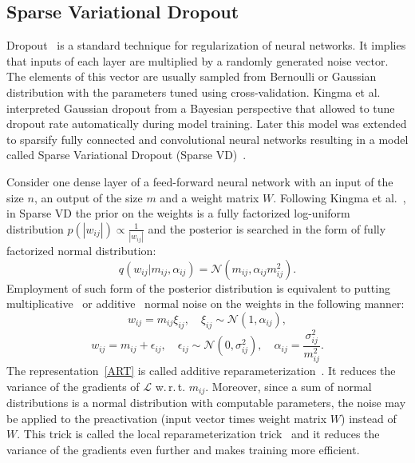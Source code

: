\documentclass{article}
\begin{document}
\subsection{Sparse Variational Dropout}
Dropout~\cite{dropout} is a standard technique for regularization of neural networks. It implies that inputs of each layer are multiplied by a randomly generated noise vector. 
The elements of this vector are usually sampled from Bernoulli or Gaussian distribution with the parameters tuned using cross-validation. Kingma et al.~ interpreted Gaussian dropout from a Bayesian perspective that allowed to tune dropout rate automatically during model training. Later this model was extended to sparsify fully connected and convolutional neural networks resulting in a model called Sparse Variational Dropout (Sparse VD)~\cite{dmolch}.

Consider one dense layer of a feed-forward neural network with an
input of the size $n$, an output of the size $m$ and 
a weight matrix $W$. 
Following Kingma et al.~, in Sparse VD the prior on the weights is a fully factorized log-uniform distribution $p(|w_{ij}|) \propto \frac 1 {|w_{ij}|}$ and the posterior is searched in the form of fully factorized normal distribution: 
\begin{equation}
q(w_{ij}|m_{ij}, \alpha_{ij}) = \mathcal{N}(m_{ij}, \alpha_{ij} m^2_{ij}).
\end{equation}
Employment of such form of the posterior distribution is equivalent to putting multiplicative~\cite{kingma} or additive~\cite{dmolch} normal noise on the weights in the following manner:
\begin{equation}
w_{ij} = m_{ij} \xi_{ij}, \quad \xi_{ij}\sim\mathcal{N}(1, \alpha_{ij}),
\end{equation}
\begin{equation}
\label{ART}
w_{ij} = m_{ij} + \epsilon_{ij}, \quad \epsilon_{ij}\sim\mathcal{N}(0, \sigma^2_{ij}), \quad \alpha_{ij} = \frac{\sigma^2_{ij}}{m^2_{ij}}.
\end{equation}
The representation~\eqref{ART} is called additive reparameterization~\cite{dmolch}. It reduces the variance of the gradients of $\mathcal{L}$ w.\,r.\,t. $m_{ij}$. Moreover, since a sum of normal distributions is a normal distribution with computable parameters, the noise may be applied to the preactivation (input vector times weight matrix $W$) instead of $W$. This trick is called the local reparameterization trick~\cite{fast_dropout,kingma} and it reduces the variance of the gradients even further and makes training more efficient.
\end{document}
